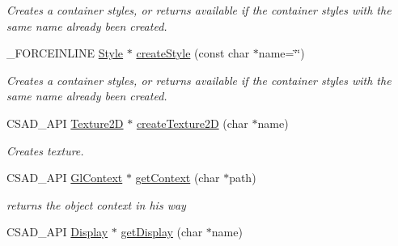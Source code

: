 \begin{DoxyCompactItemize}
\begin{DoxyCompactList}\small\item\em Creates a container styles, or returns available if the container styles with the same name already been created. \end{DoxyCompactList}\item 
\hypertarget{classcsad_1_1_graph_adda94dd62ffc4aa808634bfca84dc25b}{\-\_\-\-F\-O\-R\-C\-E\-I\-N\-L\-I\-N\-E \hyperlink{classcsad_1_1_style}{Style} $\ast$ \hyperlink{classcsad_1_1_graph_adda94dd62ffc4aa808634bfca84dc25b}{create\-Style} (const char $\ast$name=\char`\"{}\char`\"{})}\label{classcsad_1_1_graph_adda94dd62ffc4aa808634bfca84dc25b}

\begin{DoxyCompactList}\small\item\em Creates a container styles, or returns available if the container styles with the same name already been created. \end{DoxyCompactList}\item 
\hypertarget{classcsad_1_1_graph_a6de282f17fe6762354212b5d932b4d71}{C\-S\-A\-D\-\_\-\-A\-P\-I \hyperlink{classcsad_1_1_texture2_d}{Texture2\-D} $\ast$ \hyperlink{classcsad_1_1_graph_a6de282f17fe6762354212b5d932b4d71}{create\-Texture2\-D} (char $\ast$name)}\label{classcsad_1_1_graph_a6de282f17fe6762354212b5d932b4d71}

\begin{DoxyCompactList}\small\item\em Creates texture. \end{DoxyCompactList}\item 
\hypertarget{classcsad_1_1_graph_a53ec7bff2d2881675f0c934eebc66b1e}{C\-S\-A\-D\-\_\-\-A\-P\-I \hyperlink{classcsad_1_1_gl_context}{Gl\-Context} $\ast$ \hyperlink{classcsad_1_1_graph_a53ec7bff2d2881675f0c934eebc66b1e}{get\-Context} (char $\ast$path)}\label{classcsad_1_1_graph_a53ec7bff2d2881675f0c934eebc66b1e}

\begin{DoxyCompactList}\small\item\em returns the object context in his way \end{DoxyCompactList}\item 
\hypertarget{classcsad_1_1_graph_a4937813c5fdb26dc12ca1360344a28ce}{C\-S\-A\-D\-\_\-\-A\-P\-I \hyperlink{classcsad_1_1_display}{Display} $\ast$ \hyperlink{classcsad_1_1_graph_a4937813c5fdb26dc12ca1360344a28ce}{get\-Display} (char $\ast$name)}\label{classcsad_1_1_graph_a4937813c5fdb26dc12ca1360344a28ce}


\end{DoxyCompactItemize}
